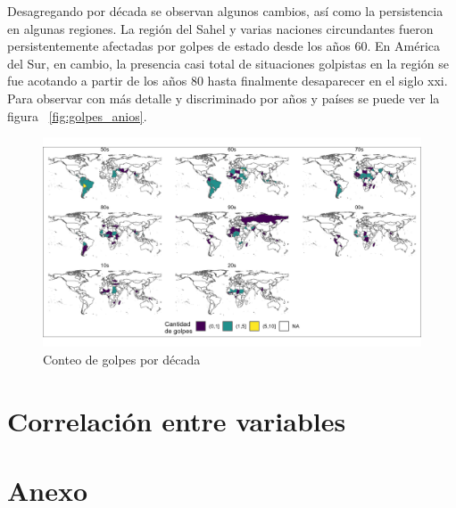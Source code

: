 \documentclass{article}
\begin{document}
Desagregando por década se observan algunos cambios, así como la persistencia en 
algunas regiones. La región del Sahel y varias naciones circundantes fueron 
persistentemente afectadas por golpes de estado desde los años 60. En América del 
Sur, en cambio, la presencia casi total de situaciones golpistas en la región se 
fue acotando a partir de los años 80 hasta finalmente desaparecer en el siglo 
xxi. Para observar con más detalle y discriminado por años y países se puede ver 
la figura ~\ref{fig:golpes_anios}.

\begin{figure}[H]
  \centering  
  \includegraphics[width=1\textwidth]{3_golpes_decadas.png}
  \caption{Conteo de golpes por década}
\end{figure}

\section{Correlación entre variables}



\section{Anexo}
\end{document}
